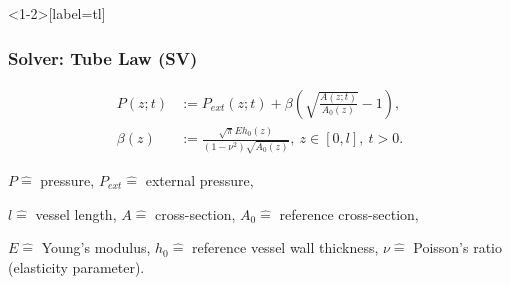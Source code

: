 \documentclass[compress]{beamer}
\begin{document}
\begin{frame}<1-2>[label=tl]
	\frametitle{Solver: Tube Law (SV)}
	\begin{align}
		P(z;t) &:= P_{ext}(z;t) + \beta \left( \sqrt{\frac{A(z;t)}{A_0(z)}}-1 \right),      \label{eq:p_tot}\\
		\beta(z) &:=  \frac{\sqrt{\pi} E h_0(z)}{(1-\nu^2) \sqrt{A_0(z)}},\  z \in \left[ 0,l \right], \ t > 0. 
	\end{align}

	\vfill

	{\tiny \centering 
		$P \hat{=}$ pressure,
		$P_{ext} \hat{=}$ external pressure,

		$l \hat{=}$ vessel length,
		$A \hat{=}$ cross-section,
		$A_0 \hat{=}$ reference cross-section,

		$E \hat{=}$ Young's modulus,
		$h_0 \hat{=}$ reference vessel wall thickness,
		$\nu \hat{=}$ Poisson's ratio (elasticity parameter). 
	\par}
\end{frame}
\end{document}
